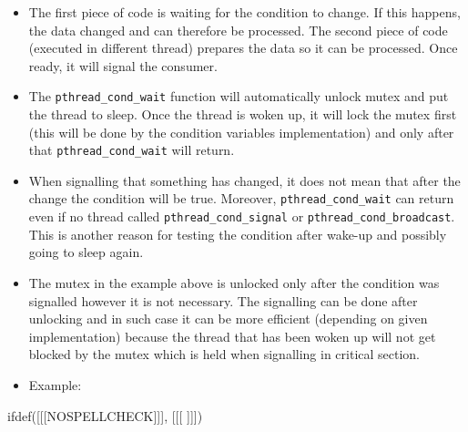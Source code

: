 \begin{itemize}
\prgchars
\item The first piece of code is waiting for the condition to change.
If this happens, the data changed and can therefore be processed.
The second piece of code (executed in different thread) prepares the
data so it can be processed. Once ready, it will signal the consumer.
\item The \texttt{pthread\_cond\_wait} function will automatically unlock mutex
and put the thread to sleep. Once the thread is woken up, it will lock the
mutex first (this will be done by the condition variables implementation)
and only after that \texttt{pthread\_cond\_wait} will return.
\item When signalling that something has changed, it does not mean that after
the change the condition will be true. Moreover,
\texttt{pthread\_cond\_wait} can return even if no thread called
\texttt{pthread\_cond\_signal} or \texttt{pthread\_cond\_broadcast}.
This is another reason for testing the condition after wake-up and possibly
going to sleep again.
\item The mutex in the example above is unlocked only after the condition
was signalled however it is not necessary. The signalling can be done
after unlocking and in such case it can be more efficient (depending on
given implementation) because the thread that has been woken up will not
get blocked by the mutex which is held when signalling in critical section.
\item \label{QUEUESIMULATION} Example:
\end{itemize}



ifdef([[[NOSPELLCHECK]]], [[[
]]])

